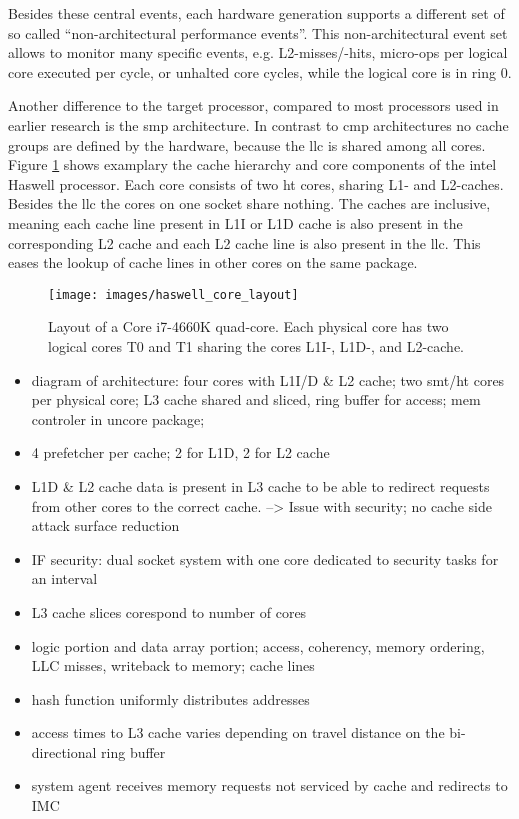 Besides these central events, each hardware generation supports a different set
of so called ``non-architectural performance events''.
This non-architectural event set allows to monitor many specific events, e.g.
L2-misses/-hits, micro-ops per logical core executed per cycle, or unhalted
core cycles, while the logical core is in ring 0.

Another difference to the target processor, compared to most processors used in
earlier research is the \gls{smp} architecture. In contrast to \gls{cmp}
architectures no cache groups are defined by the hardware, because the
\gls{llc} is shared among all cores.
Figure \ref{state:fig:core_layout} shows examplary the cache hierarchy and core
components of the \gls{intel} Haswell processor.
Each core consists of two \gls{ht} cores, sharing L1- and L2-caches.
Besides the \gls{llc} the cores on one socket share nothing.
The caches are inclusive, meaning each cache line present in L1I or L1D
cache is also present in the corresponding L2 cache and each L2 cache line is
also present in the \gls{llc}.
This eases the lookup of cache lines in other cores on the same package.


\begin{figure}[h!]
  \centering
  \texttt{[image: images/haswell\_core\_layout]}
  \caption{Layout of a Core i7-4660K quad-core.
    Each physical core has two logical cores T0 and T1 sharing the cores L1I-,
    L1D-, and L2-cache.}
  \label{state:fig:core_layout}
\end{figure}


\begin{itemize}
  \item diagram of architecture: four cores with L1I/D \& L2 cache; two smt/ht
    cores per physical core; L3 cache shared and sliced, ring buffer for
    access; mem controler in uncore package;
  \item 4 prefetcher per cache; 2 for L1D, 2 for L2 cache
  \item L1D \& L2 cache data is present in L3 cache to be able to redirect
    requests from other cores to the correct cache. --> Issue with security; no
    cache side attack surface reduction
  \item IF security: dual socket system with one core dedicated to security
    tasks for an interval
  \item L3 cache slices corespond to number of cores
  \item logic portion and data array portion; access, coherency, memory
    ordering, LLC misses, writeback to memory; cache lines
  \item hash function uniformly distributes addresses
  \item access times to L3 cache varies depending on travel distance on the
    bi-directional ring buffer
  \item system agent receives memory requests not serviced by cache and
    redirects to IMC
\end{itemize}

